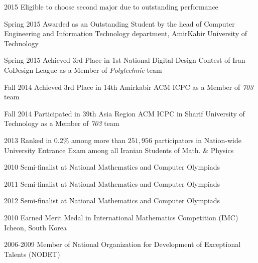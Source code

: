 \documentclass[]{friggeri-cv} %
\begin{document}
\begin{entrylist}


\entry
{2015}
{{\normalfont Eligible to choose} \textcolor{TextGreen}{second major} {\normalfont due to outstanding performance}}
{}
{}


\entry
{Spring 2015}
{\normalfont Awarded as an Outstanding Student by the head of Computer Engineering and Information Technology department, AmirKabir University of Technology}
{}
{}


\entry
{Spring 2015}
{{\normalfont Achieved} \textcolor{TextYellow}{3rd} {\normalfont Place in 1st National Digital Design Contest of Iran CoDesign League as a Member of \emph{Polytechnic} team}}
{}
{}


\entry
{Fall 2014}
{{\normalfont Achieved} \textcolor{UniBlue}{3rd} {\normalfont Place in 14th Amirkabir ACM ICPC as a Member of \emph{703} team}}
{}
{}


\entry
{Fall 2014}
{\normalfont Participated in 39th Asia Region ACM ICPC in Sharif University of Technology as a Member of \emph{703} team}
{}
{}


\entry
{2013}
{\normalfont Ranked in $0.2\%$ among more than $251,956$ participators in Nation-wide University Entrance Exam among all Iranian Students of Math. \& Physics}
{}
{}


\entry
{2010}
{\textcolor{TextOrange}{Semi-finalist} {\normalfont at National Mathematics and Computer Olympiads}}
{}
{}


\entry
{2011}
{\textcolor{TextOrange}{Semi-finalist} {\normalfont at National Mathematics and Computer Olympiads}}
{}
{}


\entry
{2012}
{\textcolor{TextOrange}{Semi-finalist} {\normalfont at National Mathematics and Computer Olympiads}}
{}
{}


\entry
{2010}
{{\normalfont Earned} \textcolor{Ocean}{Merit Medal} {\normalfont in International Mathematics Competition (IMC) Icheon, South Korea}}
{}
{}


\entry
{2006-2009}
{\normalfont Member of National Organization for Development of Exceptional Talents (NODET)}
{}
{}


\end{entrylist}
\end{document}
